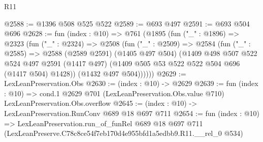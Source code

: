 \begin{lexlean}{R11}
\begin{coremodule}
@2588 := @1396 @508 @525 @522
@2589 := @693 @497
@2591 := @693 @504 @696
@2628 := fun (index : @10) =>
  @761
    (@1895
      (fun ("_" : @1896) =>
      @2323
        (fun ("_" : @2324) =>
        @2508
          (fun ("_" : @2509) =>
          @2584
            (fun ("_" : @2585) =>
            @2588
              (@2589 @2591)
              (@1405 @497 @504)
              (@1409
                @498
                @507
                @522
                @524
                @497
                @2591
                (@1417 @497)
                (@1409 @505 @53 @522 @522 @504 @696 (@1417 @504) @1428))
              (@1432 @497 @504))))))
@2629 := LexLeanPreservation.Obs
@2630 := (index : @10) -> @2629
@2639 := fun (index : @10) =>
  cond.{1} @2629 @701 (LexLeanPreservation.Obs.value @710) LexLeanPreservation.Obs.overflow
@2645 := (index : @10) -> LexLeanPreservation.RunConv @689 @18 @697 @711
@2654 := fun (index : @10) =>
  LexLeanPreservation.run_of_funRel
    @689
    @18
    @697
    @711
    (LexLeanPreserve.C78c8ce54f7eb170d4e955bfd1a5edbb9.R11.__rel_0 @534)
\end{coremodule}
\end{lexlean}
